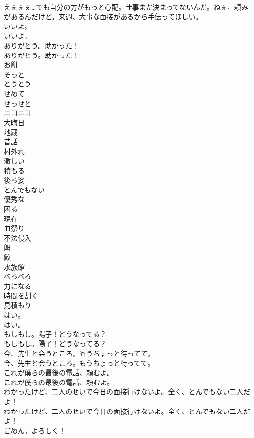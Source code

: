 \documentclass[8pt]{extreport}
\begin{document}
\begin{CJK}{UTF8}{min}
\\	えぇぇぇ…でも自分の方がもっと心配。仕事まだ決まってないんだ。ねぇ、頼みがあるんだけど。来週、大事な面接があるから手伝ってほしい。 
\\	いいよ。	
\\	いいよ。 
\\	ありがとう。助かった！	
\\	ありがとう。助かった！ 
\\	お餅
\\	そっと
\\	とうとう
\\	せめて
\\	せっせと
\\	ニコニコ
\\	大晦日
\\	地蔵
\\	昔話
\\	村外れ
\\	激しい
\\	積もる
\\	後ろ姿
\\	とんでもない
\\	優秀な
\\	困る
\\	現在
\\	血祭り
\\	不法侵入
\\	餌
\\	鮫
\\	水族館
\\	べろべろ
\\	力になる
\\	時間を割く
\\	見積もり
\\	はい。	
\\	はい。 
\\	もしもし。陽子！どうなってる？	
\\	もしもし。陽子！どうなってる？ 
\\	今、先生と会うところ。もうちょっと待ってて。	
\\	今、先生と会うところ。もうちょっと待ってて。 
\\	これが僕らの最後の電話、頼むよ。	
\\	これが僕らの最後の電話、頼むよ。 
\\	わかったけど、二人のせいで今日の面接行けないよ。全く、とんでもない二人だよ！	
\\	わかったけど、二人のせいで今日の面接行けないよ。全く、とんでもない二人だよ！ 
\\	ごめん。よろしく！	

\end{CJK}
\end{document}
